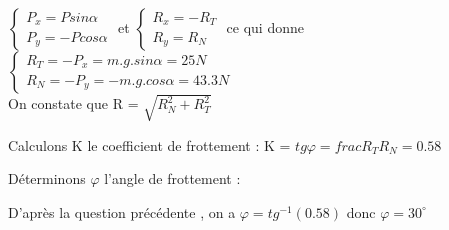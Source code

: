 \documentclass[12pt]{article}
\begin{document}
$\begin{cases}
  P_x = Psin\alpha\\
  P_y = -Pcos\alpha
\end{cases}
$ et
$\begin{cases}
  R_x = -R_T \\
  R_y = R_N
\end{cases}
$
ce qui donne
$\begin{cases}
  R_T = -P_x  = m.g.sin\alpha = 25N\\
  R_N = -P_y = -m.g.cos\alpha = 43.3N
\end{cases}
$
\\On constate que R = $\sqrt{R_N^2 + R_T^2}$

Calculons K le coefficient de frottement : K = $tg\varphi = frac{R_T}{R_N} = 0.58$

Déterminons $\varphi$ l’angle de frottement :

D’après la question précédente , on a $\varphi = tg^{-1}(0.58)$ donc $\varphi = 30^\circ$
\end{document}
